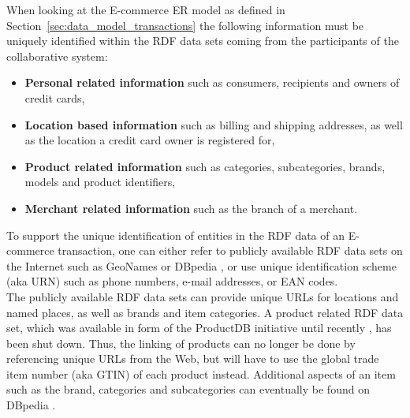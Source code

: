 When looking at the \gls{E-commerce} \gls{ER} model as defined in Section~\ref{sec:data_model_transactions} the following information must be uniquely identified within the \gls{RDF} data sets coming from the participants of the collaborative system: \@

\begin{itemize}
	\item \textbf{Personal related information} such as consumers, recipients and owners of credit cards,
	\item \textbf{Location based information} such as billing and shipping addresses, as well as the location a credit card owner is registered for,
	\item \textbf{Product related information} such as categories, subcategories, brands, models and product identifiers,
	\item \textbf{Merchant related information} such as the branch of a merchant.
\end{itemize}

To support the unique identification of entities in the \gls{RDF} data of an \gls{E-commerce} transaction, one can either refer to publicly available \gls{RDF} data sets on the Internet such as GeoNames \citep{geonames} or DBpedia \citep{dbPedia.org}, or use unique identification scheme (aka \gls{URN}) such as phone numbers, e-mail addresses, or \gls{EAN} codes. \\

The publicly available \gls{RDF} data sets can provide unique \gls{URL}s for locations and named places, as well as brands and item categories. A product related \gls{RDF} data set, which was available in form of the ProductDB initiative until recently \citep{bouzidi2014product}, has been shut down. Thus, the linking of products can no longer be done by referencing unique \gls{URL}s from the Web, but will have to use the global trade item number (aka \gls{GTIN}) of each product instead. Additional aspects of an item such as the brand, categories and subcategories can eventually be found on DBpedia \citep{dbPedia.org}. \\

